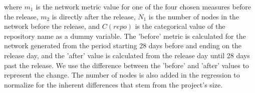  where $m_1$ is the network metric value for one of the four chosen measures before the release, $m_2$ is directly after the release, $N_1$ is the number of nodes in the network before the release, and $C(repo)$ is the categorical value of the repository name as a dummy variable. The 'before' metric is calculated for the network generated from the period starting 28 days before and ending on the release day, and the 'after' value is calculated from the release day until 28 days past the release. We use the difference between the 'before' and 'after' values to represent the change. The number of nodes is also added in the regression to normalize for the inherent differences that stem from the project's size.

\begin{table}
    \centering
\end{table}
